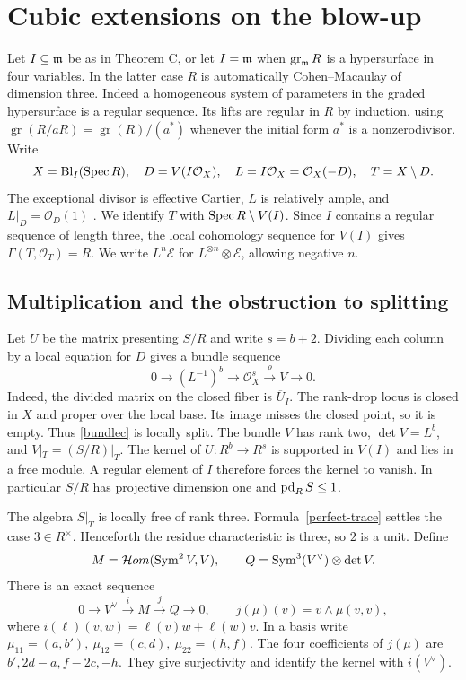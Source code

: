\section{Cubic extensions on the blow-up}\label{blowup}

Let $I\subseteq\mathfrak m$ be as in Theorem C, or let $I=\mathfrak m$ when $\operatorname{gr}_{\mathfrak m}R$ is a hypersurface in four variables. In the latter case $R$ is automatically Cohen--Macaulay of dimension three. Indeed a homogeneous system of parameters in the graded hypersurface is a regular sequence. Its lifts are regular in $R$ by induction, using $\operatorname{gr}(R/aR)=\operatorname{gr}(R)/(a^*)$ whenever the initial form $a^*$ is a nonzerodivisor. Write
\[
 X=\operatorname{Bl}_I(\operatorname{Spec} R),\quad D=V(I\mathcal O_X),\quad
 L=I\mathcal O_X=\mathcal O_X(-D),\quad T=X\setminus D.
\]
The exceptional divisor is effective Cartier, $L$ is relatively ample, and $L|_D=\mathcal O_D(1)$ \cite{Stacks}. We identify $T$ with $\operatorname{Spec} R\setminus V(I)$. Since $I$ contains a regular sequence of length three, the local cohomology sequence for $V(I)$ gives $\Gamma(T,\mathcal O_T)=R$. We write $L^n\mathcal E$ for $L^{\otimes n}\otimes\mathcal E$, allowing negative $n$.

\subsection{Multiplication and the obstruction to splitting}
Let $U$ be the matrix presenting $S/R$ and write $s=b+2$. Dividing each column by a local equation for $D$ gives a bundle sequence
\begin{equation}\label{bundlec}
 0\longrightarrow (L^{-1})^b\longrightarrow\mathcal O_X^s
       \xrightarrow{\rho} V\longrightarrow0 .
\end{equation}
Indeed, the divided matrix on the closed fiber is $\overline U_I$. The rank-drop locus is closed in $X$ and proper over the local base. Its image misses the closed point, so it is empty. Thus \eqref{bundlec} is locally split. The bundle $V$ has rank two, $\det V=L^b$, and $V|_T=(S/R)|_T$. The kernel of $U:R^b\to R^s$ is supported in $V(I)$ and lies in a free module. A regular element of $I$ therefore forces the kernel to vanish. In particular $S/R$ has projective dimension one and $\operatorname{pd}_R S\le1$.

The algebra $S|_T$ is locally free of rank three. Formula~\eqref{perfect-trace} settles the case $3\in R^\times$. Henceforth the residue characteristic is three, so $2$ is a unit. Define
\[
 M=\mathcal Hom(\operatorname{Sym}^2 V,V),\qquad Q=\operatorname{Sym}^3(V^\vee)\otimes\det V.
\]
There is an exact sequence
\begin{equation}\label{cubicsequence}
 0\longrightarrow V^\vee\xrightarrow{i}M\xrightarrow{j}Q\longrightarrow0,
 \qquad j(\mu)(v)=v\wedge\mu(v,v),
\end{equation}
where $i(\ell)(v,w)=\ell(v)w+\ell(w)v$. In a basis write
$\mu_{11}=(a,b'),\ \mu_{12}=(c,d),\ \mu_{22}=(h,f)$.
The four coefficients of $j(\mu)$ are $b',2d-a,f-2c,-h$. They give surjectivity and identify the kernel with $i(V^\vee)$.


